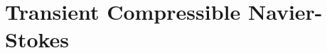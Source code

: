 \documentclass[preprint,12pt]{elsarticle}
\begin{document}



\section{Transient Compressible Navier-Stokes}
\end{document}
